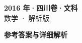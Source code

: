 \documentclass[zihao=-4, a4paper]{ctexart}
\begin{document}
\begin{center}
  {\Large\bfseries 2016 年·四川卷·文科}\\[4pt]
  {\large 数学 · 解析版}
\end{center}
\medskip
{}

\clearpage
{}
\begin{center}{\Large\bfseries 参考答案与详细解析}\end{center}
\medskip

\end{document}
